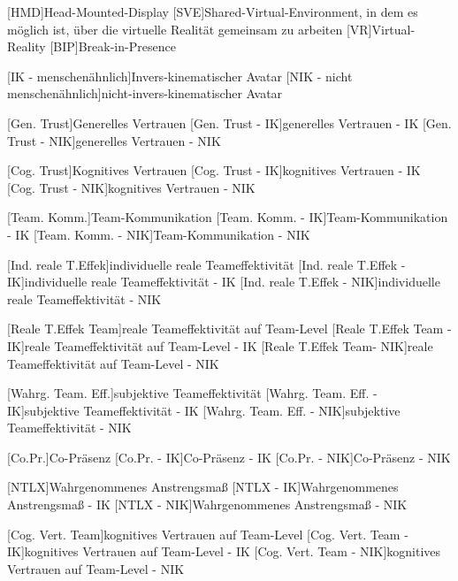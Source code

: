 \begin{acronym}
	[HMD]{Head-Mounted-Display}
	[SVE]{Shared-Virtual-Environment, in dem es möglich ist, über die virtuelle Realität gemeinsam zu arbeiten}
	[VR]{Virtual-Reality}
	[BIP]{Break-in-Presence}
	
	[IK - menschenähnlich]{Invers-kinematischer Avatar}
	[NIK - nicht menschenähnlich]{nicht-invers-kinematischer Avatar}
	
	[Gen. Trust]{Generelles Vertrauen}
	[Gen. Trust - IK]{generelles Vertrauen - IK}
	[Gen. Trust - NIK]{generelles Vertrauen - NIK}
	
	[Cog. Trust]{Kognitives Vertrauen}
	[Cog. Trust - IK]{kognitives Vertrauen - IK}
	[Cog. Trust - NIK]{kognitives Vertrauen - NIK}
	
	[Team. Komm.]{Team-Kommunikation}
	[Team. Komm. - IK]{Team-Kommunikation - IK}
	[Team. Komm. - NIK]{Team-Kommunikation - NIK}
	
	[Ind. reale T.Effek]{individuelle reale Teameffektivität}
	[Ind. reale T.Effek - IK]{individuelle reale Teameffektivität - IK}
	[Ind. reale T.Effek - NIK]{individuelle reale Teameffektivität - NIK}	
	
	[Reale T.Effek Team]{reale Teameffektivität auf Team-Level}
	[Reale T.Effek Team - IK]{reale Teameffektivität auf Team-Level - IK}
	[Reale T.Effek Team- NIK]{reale Teameffektivität auf Team-Level - NIK}
	
	[Wahrg. Team. Eff.]{subjektive Teameffektivität}
	[Wahrg. Team. Eff. - IK]{subjektive Teameffektivität - IK}
	[Wahrg. Team. Eff. - NIK]{subjektive Teameffektivität - NIK}
	
	[Co.Pr.]{Co-Präsenz}
	[Co.Pr. - IK]{Co-Präsenz - IK}
	[Co.Pr. - NIK]{Co-Präsenz - NIK}
	
	[NTLX]{Wahrgenommenes Anstrengsmaß}
	[NTLX - IK]{Wahrgenommenes Anstrengsmaß - IK}
	[NTLX - NIK]{Wahrgenommenes Anstrengsmaß - NIK}
	
	[Cog. Vert. Team]{kognitives Vertrauen auf Team-Level}
	[Cog. Vert. Team - IK]{kognitives Vertrauen auf Team-Level - IK}
	[Cog. Vert. Team - NIK]{kognitives Vertrauen auf Team-Level - NIK}
	

\end{acronym}
